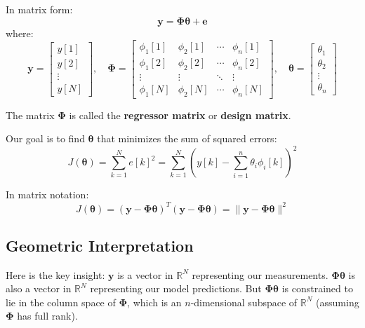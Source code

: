 In matrix form:
\begin{equation}
\mathbf{y} = \mathbf{\Phi} \boldsymbol{\theta} + \mathbf{e}
\end{equation}
where:
\begin{equation}
\mathbf{y} = \begin{bmatrix} y[1] \\ y[2] \\ \vdots \\ y[N] \end{bmatrix}, \quad
\mathbf{\Phi} = \begin{bmatrix}
\phi_1[1] & \phi_2[1] & \cdots & \phi_n[1] \\
\phi_1[2] & \phi_2[2] & \cdots & \phi_n[2] \\
\vdots & \vdots & \ddots & \vdots \\
\phi_1[N] & \phi_2[N] & \cdots & \phi_n[N]
\end{bmatrix}, \quad
\boldsymbol{\theta} = \begin{bmatrix} \theta_1 \\ \theta_2 \\ \vdots \\ \theta_n \end{bmatrix}
\end{equation}

The matrix $\mathbf{\Phi}$ is called the \textbf{regressor matrix} or \textbf{design matrix}.

Our goal is to find $\boldsymbol{\theta}$ that minimizes the sum of squared errors:
\begin{equation}
J(\boldsymbol{\theta}) = \sum_{k=1}^N e[k]^2 = \sum_{k=1}^N \left( y[k] - \sum_{i=1}^n \theta_i \phi_i[k] \right)^2
\end{equation}

In matrix notation:
\begin{equation}
J(\boldsymbol{\theta}) = (\mathbf{y} - \mathbf{\Phi}\boldsymbol{\theta})^T (\mathbf{y} - \mathbf{\Phi}\boldsymbol{\theta}) = \|\mathbf{y} - \mathbf{\Phi}\boldsymbol{\theta}\|^2
\end{equation}

\subsection{Geometric Interpretation}

Here is the key insight: $\mathbf{y}$ is a vector in $\mathbb{R}^N$ representing our measurements. $\mathbf{\Phi}\boldsymbol{\theta}$ is also a vector in $\mathbb{R}^N$ representing our model predictions. But $\mathbf{\Phi}\boldsymbol{\theta}$ is constrained to lie in the column space of $\mathbf{\Phi}$, which is an $n$-dimensional subspace of $\mathbb{R}^N$ (assuming $\mathbf{\Phi}$ has full rank).

